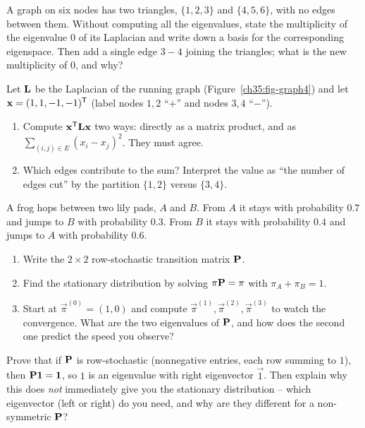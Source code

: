 \begin{exercise}
\label{ch35:ex-components}
A graph on six nodes has two triangles, $\{1,2,3\}$ and $\{4,5,6\}$, with no edges between
them. Without computing all the eigenvalues, state the multiplicity of the eigenvalue $0$ of
its Laplacian and write down a basis for the corresponding eigenspace. Then add a single
edge $3\!-\!4$ joining the triangles; what is the new multiplicity of $0$, and why?
\end{exercise}

\begin{exercise}
\label{ch35:ex-energy}
Let $\mathbf{L}$ be the Laplacian of the running graph (Figure~\ref{ch35:fig-graph4}) and let
$\mathbf{x} = (1,1,-1,-1)^{\mathsf{T}}$ (label nodes $1,2$ ``$+$'' and nodes $3,4$ ``$-$'').
\begin{enumerate}
\item Compute $\mathbf{x}^{\mathsf{T}}\mathbf{L}\mathbf{x}$ two ways: directly as a matrix product, and as
$\sum_{(i,j)\in E}(x_i-x_j)^2$. They must agree.
\item Which edges contribute to the sum? Interpret the value as ``the number of edges cut''
by the partition $\{1,2\}$ versus $\{3,4\}$.
\end{enumerate}
\end{exercise}

\begin{exercise}
\label{ch35:ex-stationary}
A frog hops between two lily pads, $A$ and $B$. From $A$ it stays with probability $0.7$ and
jumps to $B$ with probability $0.3$. From $B$ it stays with probability $0.4$ and jumps to
$A$ with probability $0.6$.
\begin{enumerate}
\item Write the $2\times2$ row-stochastic transition matrix $\mathbf{P}$.
\item Find the stationary distribution by solving $\mathbf{\pi}\mathbf{P} = \mathbf{\pi}$ with
$\pi_A + \pi_B = 1$.
\item Start at $\vec\pi^{(0)} = (1,0)$ and compute $\vec\pi^{(1)}, \vec\pi^{(2)},
\vec\pi^{(3)}$ to watch the convergence. What are the two eigenvalues of $\mathbf{P}$, and how
does the second one predict the speed you observe?
\end{enumerate}
\end{exercise}

\begin{exercise}
\label{ch35:ex-perron}
Prove that if $\mathbf{P}$ is row-stochastic (nonnegative entries, each row summing to $1$),
then $\mathbf{P}\mathbf{1} = \mathbf{1}$, so $1$ is an eigenvalue with right eigenvector $\vec{1}$.
Then explain why this does \emph{not} immediately give you the stationary distribution --
which eigenvector (left or right) do you need, and why are they different for a
non-symmetric $\mathbf{P}$?
\end{exercise}

